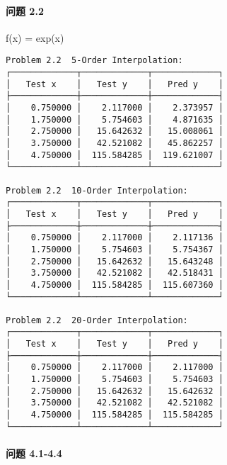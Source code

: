 \documentclass[11pt]{article}
\begin{document}
    \hypertarget{ux95eeux9898-2.2}{%
\paragraph{问题 2.2}\label{ux95eeux9898-2.2}}

    f(x) = exp(x)

\begin{verbatim}
Problem 2.2  5-Order Interpolation:
┌─────────────┬─────────────┬─────────────┐
│   Test x    │   Test y    │   Pred y    │
├─────────────┼─────────────┼─────────────┤
│    0.750000 │    2.117000 │    2.373957 │
│    1.750000 │    5.754603 │    4.871635 │
│    2.750000 │   15.642632 │   15.008061 │
│    3.750000 │   42.521082 │   45.862257 │
│    4.750000 │  115.584285 │  119.621007 │
└─────────────┴─────────────┴─────────────┘

Problem 2.2  10-Order Interpolation:
┌─────────────┬─────────────┬─────────────┐
│   Test x    │   Test y    │   Pred y    │
├─────────────┼─────────────┼─────────────┤
│    0.750000 │    2.117000 │    2.117136 │
│    1.750000 │    5.754603 │    5.754367 │
│    2.750000 │   15.642632 │   15.643248 │
│    3.750000 │   42.521082 │   42.518431 │
│    4.750000 │  115.584285 │  115.607360 │
└─────────────┴─────────────┴─────────────┘

Problem 2.2  20-Order Interpolation:
┌─────────────┬─────────────┬─────────────┐
│   Test x    │   Test y    │   Pred y    │
├─────────────┼─────────────┼─────────────┤
│    0.750000 │    2.117000 │    2.117000 │
│    1.750000 │    5.754603 │    5.754603 │
│    2.750000 │   15.642632 │   15.642632 │
│    3.750000 │   42.521082 │   42.521082 │
│    4.750000 │  115.584285 │  115.584285 │
└─────────────┴─────────────┴─────────────┘
\end{verbatim}

    \hypertarget{ux95eeux9898-4.1-4.4}{%
\paragraph{问题 4.1-4.4}\label{ux95eeux9898-4.1-4.4}}
\end{document}
